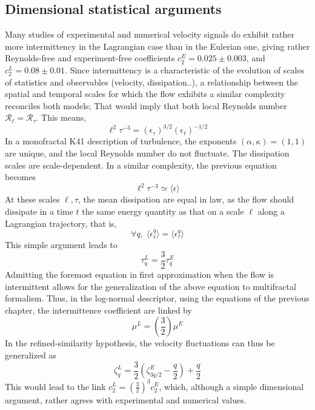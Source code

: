 \subsection{Dimensional statistical arguments}
Many studies of experimental and numerical velocity signals do exhibit rather more intermittency in the Lagrangian case than in the Eulerian one, giving rather Reynolds-free and experiment-free coefficients $c_2^E=0.025\pm0.003$, and $c_2^L=0.08\pm0.01$. 
Since intermittency is a characteristic of the evolution of scales of statistics and observables (velocity, dissipation..), a relationship between the spatial and temporal scales for which the flow exhibits a similar complexity reconciles both models; 
That would imply that both local Reynolds number $\mathcal{R}_\ell=\mathcal{R}_\tau$.
This means,
\begin{equation}
    \ell^2\tau^{-3}=(\epsilon_\tau)^{3/2}(\epsilon_\ell)^{-1/2}
\end{equation}
In a monofractal K41 description of turbulence, the exponents $(\alpha,\kappa)=(1,1)$ are unique, and the local Reynolds number do not fluctuate. The dissipation scales are scale-dependent. In a similar complexity, the previous equation becomes
\begin{equation}
    \ell^2\tau^{-3}\simeq\langle\epsilon\rangle
\end{equation}
At these scales $\ell,\tau$, the mean dissipation are equal in law, as the flow should dissipate in a time $t$ the same energy quantity as that on a scale $\ell$ along a Lagrangian trajectory, that is, 
\begin{equation}
    \forall q,\;\langle\epsilon_\ell^q\rangle=\langle\epsilon_\tau^q\rangle
\end{equation}
This simple argument leads to
\begin{equation}
    \tau_q^L=\frac{3}{2}\tau_q^E
\end{equation}
Admitting the foremost equation in first approximation when the flow is intermittent allows for the generalization of the above equation to multifractal formalism. Thus, in the log-normal descriptor, using the equations of the previous chapter, the intermittence coefficient are linked by
\begin{equation}
    \mu^L=\left(\frac{3}{2}\right)\mu^E
\end{equation}
In the refined-similarity hypothesis, the velocity fluctuations can thus be generalized as
\begin{equation}
    \zeta_q^L=\frac{3}{2}\left(\zeta^E_{3q/2}-\frac{q}{2}\right)+\frac{q}{2}
\end{equation}
This would lead to the link $\displaystyle c_2^L=\left(\frac{3}{2}\right)^3c_2^E$, which, although a simple dimensional argument, rather agrees with experimental and numerical values.   


